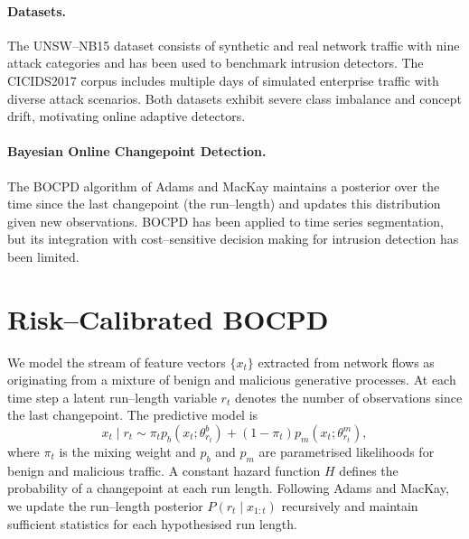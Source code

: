 \documentclass{article}
\begin{document}
\paragraph{Datasets.}  The UNSW--NB15 dataset\cite{moustafa2015unsw,moustafa2016unswEval} consists of synthetic and real network traffic with nine attack categories and has been used to benchmark intrusion detectors.  The CICIDS2017 corpus\cite{sharafaldin2018cicids} includes multiple days of simulated enterprise traffic with diverse attack scenarios.  Both datasets exhibit severe class imbalance and concept drift, motivating online adaptive detectors.

\paragraph{Bayesian Online Changepoint Detection.}  The BOCPD algorithm of Adams and MacKay\cite{adams2007bocpd} maintains a posterior over the time since the last changepoint (the run--length) and updates this distribution given new observations.  BOCPD has been applied to time series segmentation, but its integration with cost--sensitive decision making for intrusion detection has been limited.

\section{Risk--Calibrated BOCPD}
We model the stream of feature vectors \(\{x_t\}\) extracted from network flows as originating from a mixture of benign and malicious generative processes.  At each time step a latent run--length variable \(r_t\) denotes the number of observations since the last changepoint.  The predictive model is
\begin{equation}
  x_t \mid r_t \sim \pi_t p_b(x_t; \theta^b_{r_t}) + (1-\pi_t) p_m(x_t; \theta^m_{r_t}),
\end{equation}
where \(\pi_t\) is the mixing weight and \(p_b\) and \(p_m\) are parametrised likelihoods for benign and malicious traffic.  A constant hazard function \(H\) defines the probability of a changepoint at each run length.  Following Adams and MacKay\cite{adams2007bocpd}, we update the run--length posterior \(P(r_t \mid x_{1:t})\) recursively and maintain sufficient statistics for each hypothesised run length.
\end{document}
